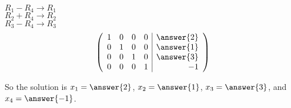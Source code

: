 \documentclass{ximera}
\begin{document}
\begin{exercise}
\begin{prompt}
$R_1-R_4  \rightarrow R_1$  \\  
$R_2+R_4  \rightarrow R_2$ \\
$R_3-R_4  \rightarrow R_3$
\[
\left(\begin{array}{rrrr|r}
     1 &  0 &  0 &   0 &  \answer{2} \\
     0 &  1 &  0 &   0 &  \answer{1} \\
     0 &  0 &  1 &   0 &  \answer{3} \\
     0 &  0 &  0 &   1 & -1 
\end{array}\right)
\]

So the solution is 
$x_1=\answer{2}$, 
$x_2=\answer{1}$,
$x_3=\answer{3}$, and
$x_4=\answer{-1}$. 

\end{prompt}

\end{exercise}

%
\end{document}
